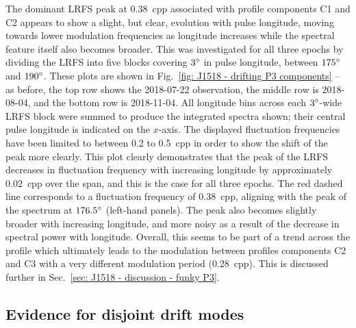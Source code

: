 The dominant LRFS peak at $0.38$~cpp associated with profile components C1 and C2 appears to show a slight, but clear, evolution with pulse longitude, moving towards lower modulation frequencies as longitude increases while the spectral feature itself also becomes broader. This was investigated for all three epochs by dividing the LRFS into five blocks covering $3^\circ$ in pulse longitude, between $175^\circ$ and $190^\circ$. These plots are shown in Fig.~\ref{fig: J1518 - drifting P3 components} -- as before, the top row shows the 2018-07-22 observation, the middle row is 2018-08-04, and the bottom row is 2018-11-04. All longitude bins across each $3^\circ$-wide LRFS block were summed to produce the integrated spectra shown; their central pulse longitude is indicated on the $x$-axis. The displayed fluctuation frequencies have been limited to between 0.2 to 0.5~cpp in order to show the shift of the peak more clearly. This plot clearly demonstrates that the peak of the LRFS decreases in fluctuation frequency with increasing longitude by approximately $0.02$~cpp over the span, and this is the case for all three epochs. The red dashed line corresponds to a fluctuation frequency of 0.38~cpp, aligning with the peak of the spectrum at $176.5^\circ$ (left-hand panels). The peak also becomes slightly broader with increasing longitude, and more noisy as a result of the decrease in spectral power with longitude. Overall, this seems to be part of a trend across the profile which ultimately leads to the modulation between profiles components C2 and C3 with a very different modulation period (0.28~cpp).  This is discussed further in Sec.~\ref{sec: J1518 - discussion - funky P3}.















\subsection{Evidence for disjoint drift modes}
\label{sec: J1518 - analysis - disjoint modes}

